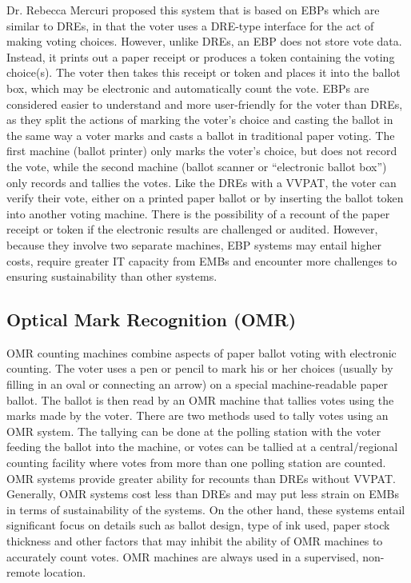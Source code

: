 \documentclass{article}
\begin{document}
Dr. Rebecca Mercuri proposed this system that is based on EBPs which are similar to DREs, in that the voter uses a DRE-type interface for the act of making voting choices. However, unlike DREs, an EBP does not store vote data. Instead, it prints out a paper receipt or produces a token containing the voting choice(s). The voter then takes this receipt or token and places it into the ballot box, which may be electronic and automatically count the vote. 
EBPs are considered easier to understand and more user-friendly for the voter than DREs, as they split the actions of marking the voter’s choice and casting the ballot in the same way a voter marks and casts a ballot in traditional paper voting. The first machine (ballot printer) only marks the voter’s choice, but does not record the vote, while the second machine (ballot scanner or “electronic ballot box”) only records and tallies the votes. Like the DREs with a VVPAT, the voter can verify their vote, either on a printed paper ballot or by inserting the ballot token into another voting machine. There is the possibility of a recount of the paper receipt or token if the electronic results are challenged or audited. However, because they involve two separate machines, EBP systems may entail higher costs, require greater IT capacity from EMBs and encounter more challenges to ensuring sustainability than other systems.
 
 
\subsection{Optical Mark Recognition (OMR)}
OMR counting machines combine aspects of paper ballot voting with electronic counting. The voter uses a pen or pencil to mark his or her choices (usually by filling in an oval or connecting an arrow) on a special machine-readable paper ballot. The ballot is then read by an OMR machine that tallies votes using the marks made by the voter. There are two methods used to tally votes using an OMR system. The tallying can be done at the polling station with the voter feeding the ballot into the machine, or votes can be tallied at a central/regional counting facility where votes from more than one polling station are counted. 
OMR systems provide greater ability for recounts than DREs without VVPAT. Generally, OMR systems cost less than DREs and may put less strain on EMBs in terms of sustainability of the systems. On the other hand, these systems entail significant focus on details such as ballot design, type of ink used, paper stock thickness and other factors that may inhibit the ability of OMR machines to accurately count votes. OMR machines are always used in a supervised, non-remote location.
 
\end{document}
